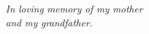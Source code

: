 \cleardoublepage
\thispagestyle{empty}
\null\vspace{2cm}
\begin{flushright}\emph{
	\small
	In loving memory of my mother\\
	and my grandfather.}
\end{flushright}
\null
